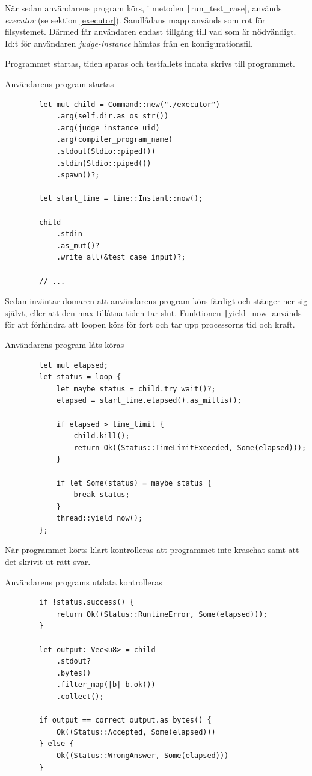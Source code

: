 \documentclass{article}
\begin{document}
När sedan användarens program körs, i metoden
\texttt|run_test_case|, används
\textit{executor} (se sektion \ref{executor}). Sandlådans mapp används som rot
för filsystemet. Därmed får användaren endast tillgång till vad som är
nödvändigt. Id:t för användaren \textit{judge-instance} hämtas från en
konfigurationsfil.

Programmet startas, tiden sparas
och testfallets indata skrivs till programmet.

\begin{listing}[H]
	\caption{Användarens program startas}
	\begin{verbatim}
		let mut child = Command::new("./executor")
			.arg(self.dir.as_os_str())
			.arg(judge_instance_uid)
			.arg(compiler_program_name)
			.stdout(Stdio::piped())
			.stdin(Stdio::piped())
			.spawn()?;

		let start_time = time::Instant::now();

		child
			.stdin
			.as_mut()?
			.write_all(&test_case_input)?;

		// ...
	\end{verbatim}
\end{listing}

Sedan inväntar domaren att användarens program körs färdigt och stänger ner sig
självt, eller att den max tillåtna tiden tar slut. Funktionen
\texttt|yield_now| används för att förhindra att loopen körs för fort och tar
upp processorns tid och kraft.

\begin{listing}[H]
	\caption{Användarens program låts köras}
	\begin{verbatim}
		let mut elapsed;
		let status = loop {
			let maybe_status = child.try_wait()?;
			elapsed = start_time.elapsed().as_millis();

			if elapsed > time_limit {
				child.kill();
				return Ok((Status::TimeLimitExceeded, Some(elapsed)));
			}

			if let Some(status) = maybe_status {
				break status;
			}
			thread::yield_now();
		};
	\end{verbatim}
\end{listing}

När programmet körts klart kontrolleras att programmet inte kraschat samt att
det skrivit ut rätt svar.

\begin{listing}[H]
	\caption{Användarens programs utdata kontrolleras}
	\begin{verbatim}
		if !status.success() {
			return Ok((Status::RuntimeError, Some(elapsed)));
		}

		let output: Vec<u8> = child
			.stdout?
			.bytes()
			.filter_map(|b| b.ok())
			.collect();

		if output == correct_output.as_bytes() {
			Ok((Status::Accepted, Some(elapsed)))
		} else {
			Ok((Status::WrongAnswer, Some(elapsed)))
		}
	\end{verbatim}
\end{listing}
\end{document}

